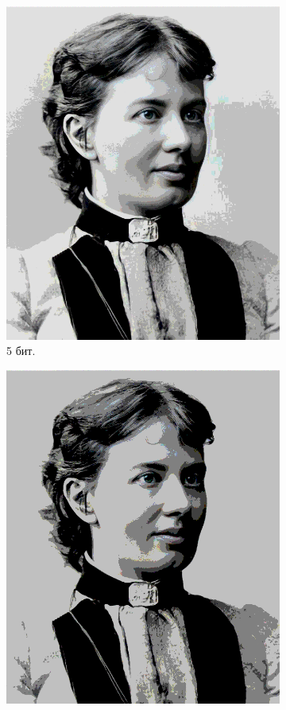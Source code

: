 \documentclass[11pt,a4paper,final]{article} %
\begin{document}
\begin{figure}[h!]
\begin{subfigure}[b]{0.3\linewidth}
		\includegraphics[width=\linewidth]{img/sofya-5-5.png}
		\caption{5 бит.}
		\label{fig:david5}
	\end{subfigure}
	\hfill
	\begin{subfigure}[b]{0.3\linewidth}
		\centering
		\includegraphics[width=\linewidth]{img/sofya-6-5.png}

\end{subfigure}
\end{figure}
\end{document}
